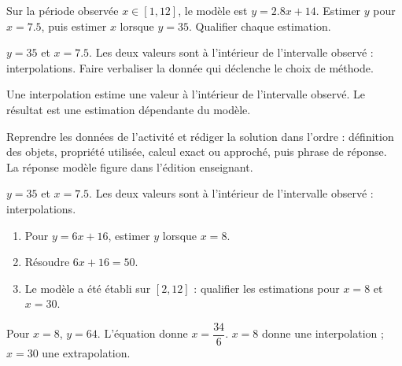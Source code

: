 \begin{activity}
Sur la période observée $x\in[1,12]$, le modèle est $y=\num{2,8}x+14$. Estimer $y$ pour $x=\num{7,5}$, puis estimer $x$ lorsque $y=35$. Qualifier chaque estimation.
\begin{center}\end{center}
\end{activity}
\begin{solution}$y=35$ et $x=\num{7,5}$. Les deux valeurs sont à l'intérieur de l'intervalle observé : interpolations. Faire verbaliser la donnée qui déclenche le choix de méthode.\end{solution}

\begin{summary}Une interpolation estime une valeur à l'intérieur de l'intervalle observé. Le résultat est une estimation dépendante du modèle.\end{summary}

\begin{example}
Reprendre les données de l'activité et rédiger la solution dans l'ordre : définition des objets, propriété utilisée, calcul exact ou approché, puis phrase de réponse. La réponse modèle figure dans l'édition enseignant.
\end{example}
\begin{solution}$y=35$ et $x=\num{7,5}$. Les deux valeurs sont à l'intérieur de l'intervalle observé : interpolations.\end{solution}

\begin{exercise}[essentiel]
\begin{enumerate}\item Pour $y=6x+16$, estimer $y$ lorsque $x=8$.\item Résoudre $6x+16=50$.\item Le modèle a été établi sur $[2,12]$ : qualifier les estimations pour $x=8$ et $x=30$.\end{enumerate}
\end{exercise}
\begin{solution}Pour $x=8$, $y=64$. L'équation donne $x=\dfrac{34}{6}$. $x=8$ donne une interpolation ; $x=30$ une extrapolation.\end{solution}

